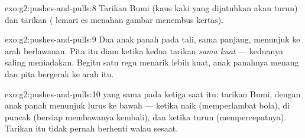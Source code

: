 \begin{solution}{exo:g2:pushes-and-pulls:8}
Tarikan Bumi (kaus kaki yang dijatuhkan akan turun) dan tarikan 
( lemari es menahan gambar menembus kertas).
\end{solution}

\begin{solution}{exo:g2:pushes-and-pulls:9}
Dua anak panah pada tali, sama panjang, menunjuk ke arah berlawanan.
Pita itu diam ketika kedua tarikan \emph{sama kuat} --- keduanya
saling meniadakan. Begitu satu regu menarik lebih kuat, anak panahnya
menang dan pita bergerak ke arah itu.
\end{solution}

\begin{solution}{exo:g2:pushes-and-pulls:10}
 yang sama pada ketiga saat itu: tarikan Bumi, dengan anak panah
menunjuk lurus ke bawah --- ketika naik (memperlambat bola), di puncak
(bersiap membawanya kembali), dan ketika turun (mempercepatnya).
Tarikan itu tidak pernah berhenti walau sesaat.
\end{solution}
